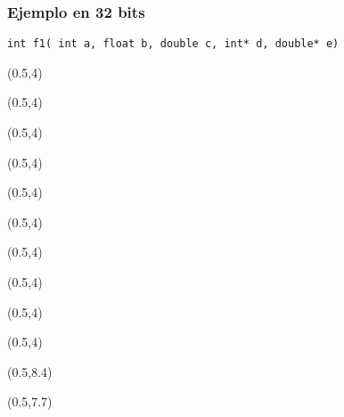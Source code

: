 \documentclass[aspectratio=169]{beamer}
\begin{document}
\begin{frame}[t,fragile]
\frametitle{Ejemplo en 32 bits}
\begin{verbatim}
int f1( int a, float b, double c, int* d, double* e)
\end{verbatim}
    \begin{textblock}{20}(0.5,4)  \end{textblock}
    \begin{textblock}{20}(0.5,4)  \end{textblock}
    \begin{textblock}{20}(0.5,4)  \end{textblock}
    \begin{textblock}{20}(0.5,4)  \end{textblock}
    \begin{textblock}{20}(0.5,4)  \end{textblock}
    \begin{textblock}{20}(0.5,4)  \end{textblock}
    \begin{textblock}{20}(0.5,4)  \end{textblock}
    \begin{textblock}{20}(0.5,4)  \end{textblock}
    \begin{textblock}{20}(0.5,4)  \end{textblock}
    \begin{textblock}{20}(0.5,4)  \end{textblock}
    \begin{textblock}{20}(0.5,8.4)  \end{textblock}
    \begin{textblock}{20}(0.5,7.7)  \end{textblock}

\end{frame}
\end{document}

